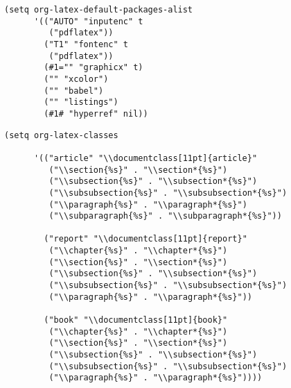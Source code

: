 \documentclass[french]{report}
\begin{document}
\lstset{language=Lisp,label= ,caption= ,captionpos=b,numbers=none}
\begin{lstlisting}
(setq org-latex-default-packages-alist
      '(("AUTO" "inputenc" t
         ("pdflatex"))
        ("T1" "fontenc" t
         ("pdflatex"))
        (#1="" "graphicx" t)
        ("" "xcolor")
        ("" "babel")
        ("" "listings")
        (#1# "hyperref" nil))
\end{lstlisting}

\lstset{language=Lisp,label= ,caption= ,captionpos=b,numbers=none}
\begin{lstlisting}
(setq org-latex-classes

      '(("article" "\\documentclass[11pt]{article}"
         ("\\section{%s}" . "\\section*{%s}")
         ("\\subsection{%s}" . "\\subsection*{%s}")
         ("\\subsubsection{%s}" . "\\subsubsection*{%s}")
         ("\\paragraph{%s}" . "\\paragraph*{%s}")
         ("\\subparagraph{%s}" . "\\subparagraph*{%s}"))

        ("report" "\\documentclass[11pt]{report}"
         ("\\chapter{%s}" . "\\chapter*{%s}")
         ("\\section{%s}" . "\\section*{%s}")
         ("\\subsection{%s}" . "\\subsection*{%s}")
         ("\\subsubsection{%s}" . "\\subsubsection*{%s}")
         ("\\paragraph{%s}" . "\\paragraph*{%s}"))

        ("book" "\\documentclass[11pt]{book}"
         ("\\chapter{%s}" . "\\chapter*{%s}")
         ("\\section{%s}" . "\\section*{%s}")
         ("\\subsection{%s}" . "\\subsection*{%s}")
         ("\\subsubsection{%s}" . "\\subsubsection*{%s}")
         ("\\paragraph{%s}" . "\\paragraph*{%s}"))))
\end{lstlisting}
\end{document}
